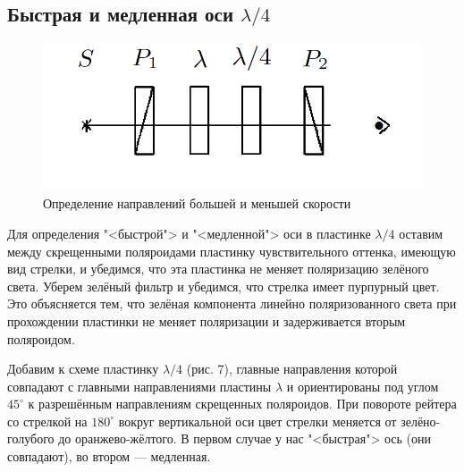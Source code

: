 \documentclass[a4paper,12pt]{article}
\begin{document}
\subsection{Быстрая и медленная оси $ \lambda/4 $}
\begin{figure}
	\includegraphics[width=\linewidth]{8}
	\caption{Определение направлений большей и меньшей скорости}
	\label{ris 8}
\end{figure}
Для определения "<быстрой"> и "<медленной"> оси в пластинке $ \lambda/4 $ оставим между скрещенными поляроидами пластинку чувствительного оттенка, имеющую вид стрелки, и убедимся, что эта пластинка не меняет поляризацию зелёного света. Уберем зелёный фильтр и убедимся, что стрелка имеет пурпурный
цвет. Это объясняется тем, что зелёная компонента линейно поляризованного света при прохождении пластинки не меняет поляризации и задерживается вторым поляроидом.

Добавим к схеме пластинку $ \lambda/4 $ (рис. 7), главные направления которой совпадают с главными направлениями пластины $ \lambda $ и ориентированы
под углом $ 45^\circ $ к разрешённым направлениям скрещенных поляроидов.
При повороте рейтера со стрелкой на $ 180^\circ $ вокруг вертикальной оси
цвет стрелки меняется от зелёно-голубого до оранжево-жёлтого. В первом случае у нас "<быстрая"> ось (они совпадают), во втором --- медленная.
\end{document}
